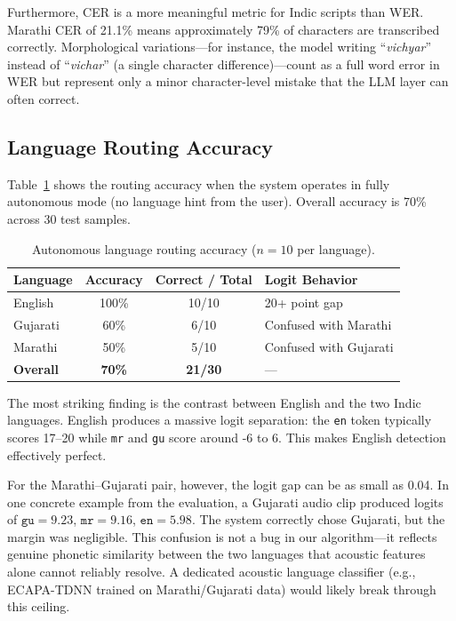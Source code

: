 Furthermore, CER is a more meaningful metric for Indic scripts than WER. Marathi CER of 21.1\% means approximately 79\% of characters are transcribed correctly. Morphological variations---for instance, the model writing ``\textit{vichyar}'' instead of ``\textit{vichar}'' (a single character difference)---count as a full word error in WER but represent only a minor character-level mistake that the LLM layer can often correct.

\subsection{Language Routing Accuracy}

Table~\ref{tab:routing} shows the routing accuracy when the system operates in fully autonomous mode (no language hint from the user). Overall accuracy is 70\% across 30 test samples.

\begin{table}[t]
\centering
\caption{Autonomous language routing accuracy ($n = 10$ per language).}
\label{tab:routing}
\begin{tabular}{lccl}
\toprule
\textbf{Language} & \textbf{Accuracy} & \textbf{Correct / Total} & \textbf{Logit Behavior} \\
\midrule
English   & 100\% & 10/10 & 20+ point gap \\
Gujarati  & 60\%  & 6/10  & Confused with Marathi \\
Marathi   & 50\%  & 5/10  & Confused with Gujarati \\
\midrule
\textbf{Overall} & \textbf{70\%} & \textbf{21/30} & --- \\
\bottomrule
\end{tabular}
\end{table}

The most striking finding is the contrast between English and the two Indic languages. English produces a massive logit separation: the \texttt{en} token typically scores 17--20 while \texttt{mr} and \texttt{gu} score around -6 to 6. This makes English detection effectively perfect.

For the Marathi--Gujarati pair, however, the logit gap can be as small as 0.04. In one concrete example from the evaluation, a Gujarati audio clip produced logits of $\texttt{gu} = 9.23$, $\texttt{mr} = 9.16$, $\texttt{en} = 5.98$. The system correctly chose Gujarati, but the margin was negligible. This confusion is not a bug in our algorithm---it reflects genuine phonetic similarity between the two languages that acoustic features alone cannot reliably resolve. A dedicated acoustic language classifier (e.g., ECAPA-TDNN trained on Marathi/Gujarati data) would likely break through this ceiling.

